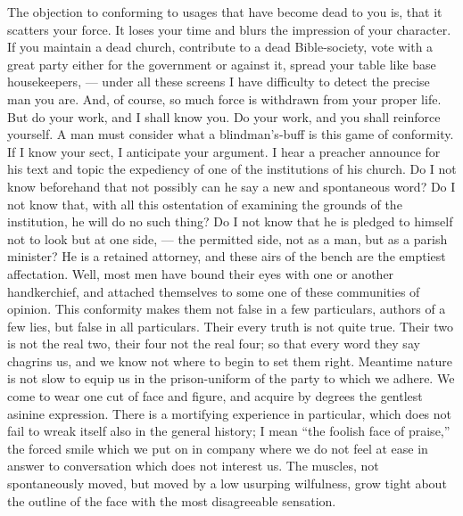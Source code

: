 \documentclass[12pt]{article}
\begin{document}
The objection to conforming to usages that have become dead to you is, that
it scatters your force. It loses your time and blurs the impression of your
character. If you maintain a dead church, contribute to a dead
Bible-society, vote with a great party either for the government or against
it, spread your table like base housekeepers, --- under all these screens I
have difficulty to detect the precise man you are. And, of course, so much
force is withdrawn from your proper life. But do your work, and I shall know
you. Do your work, and you shall reinforce yourself. A man must consider
what a blindman's-buff is this game of conformity. If I know your sect, I
anticipate your argument. I hear a preacher announce for his text and topic
the expediency of one of the institutions of his church. Do I not know
beforehand that not possibly can he say a new and spontaneous word? Do I not
know that, with all this ostentation of examining the grounds of the
institution, he will do no such thing? Do I not know that he is pledged to
himself not to look but at one side, --- the permitted side, not as a man,
but as a parish minister? He is a retained attorney, and these airs of the
bench are the emptiest affectation. Well, most men have bound their eyes
with one or another handkerchief, and attached themselves to some one of
these communities of opinion. This conformity makes them not false in a few
particulars, authors of a few lies, but false in all particulars. Their
every truth is not quite true. Their two is not the real two, their four not
the real four; so that every word they say chagrins us, and we know not
where to begin to set them right. Meantime nature is not slow to equip us in
the prison-uniform of the party to which we adhere. We come to wear one cut
of face and figure, and acquire by degrees the gentlest asinine expression.
There is a mortifying experience in particular, which does not fail to wreak
itself also in the general history; I mean ``the foolish face of praise,'' the
forced smile which we put on in company where we do not feel at ease in
answer to conversation which does not interest us. The muscles, not
spontaneously moved, but moved by a low usurping wilfulness, grow tight
about the outline of the face with the most disagreeable sensation.
\end{document}
